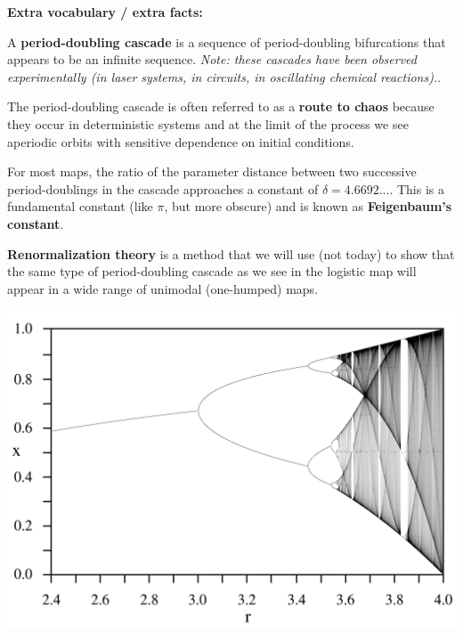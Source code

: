 \documentclass[12pt,letterpaper,noanswers]{exam}
\begin{document}
\noindent \textbf{Extra vocabulary / extra facts:}
\begin{tcolorbox}

A \textbf{period-doubling cascade} is a sequence of period-doubling bifurcations that appears to be an infinite sequence.  \emph{Note: these cascades have been observed experimentally (in laser systems, in circuits, in oscillating chemical reactions).}.  

The period-doubling cascade is often referred to as a \textbf{route to chaos} because they occur in deterministic systems and at the limit of the process we see aperiodic orbits with sensitive dependence on initial conditions.

For most maps, the ratio of the parameter distance between two successive period-doublings in the cascade approaches a constant of $\delta = 4.6692...$.  This is a fundamental constant (like $\pi$, but more obscure) and is known as \textbf{Feigenbaum's constant}.  

\textbf{Renormalization theory} is a method that we will use (not today) to show that the same type of period-doubling cascade as we see in the logistic map will appear in a wide range of unimodal (one-humped) maps.
\end{tcolorbox}


\includegraphics[width=6in]{img/logistic.png}
\end{document}

